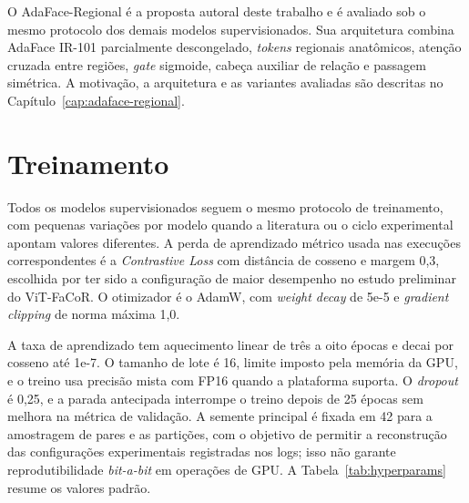 O AdaFace-Regional é a proposta autoral deste trabalho e é avaliado sob o mesmo protocolo dos demais modelos supervisionados. Sua arquitetura combina AdaFace IR-101 parcialmente descongelado, \textit{tokens} regionais anatômicos, atenção cruzada entre regiões, \textit{gate} sigmoide, cabeça auxiliar de relação e passagem simétrica. A motivação, a arquitetura e as variantes avaliadas são descritas no Capítulo~\ref{cap:adaface-regional}.

\section{Treinamento}

Todos os modelos supervisionados seguem o mesmo protocolo de treinamento, com pequenas variações por modelo quando a literatura ou o ciclo experimental apontam valores diferentes. A perda de aprendizado métrico usada nas execuções correspondentes é a \textit{Contrastive Loss} com distância de cosseno e margem 0,3, escolhida por ter sido a configuração de maior desempenho no estudo preliminar do ViT-FaCoR. O otimizador é o AdamW, com \textit{weight decay} de 5e-5 e \textit{gradient clipping} de norma máxima 1,0.

A taxa de aprendizado tem aquecimento linear de três a oito épocas e decai por cosseno até 1e-7. O tamanho de lote é 16, limite imposto pela memória da GPU, e o treino usa precisão mista com FP16 quando a plataforma suporta. O \textit{dropout} é 0,25, e a parada antecipada interrompe o treino depois de 25 épocas sem melhora na métrica de validação. A semente principal é fixada em 42 para a amostragem de pares e as partições, com o objetivo de permitir a reconstrução das configurações experimentais registradas nos logs; isso não garante reprodutibilidade \textit{bit-a-bit} em operações de GPU. A Tabela~\ref{tab:hyperparams} resume os valores padrão.


